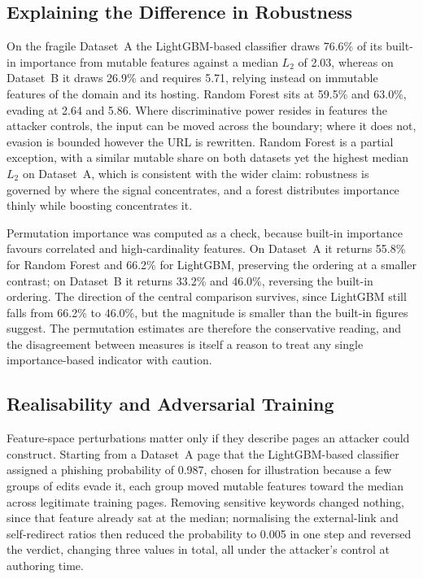 \documentclass[runningheads]{llncs}
\begin{document}
\subsection{Explaining the Difference in Robustness}
\label{sec:res-reliance}

On the fragile Dataset~A the LightGBM-based classifier draws 76.6\% of its built-in importance from mutable features against a median
$L_2$ of 2.03, whereas on Dataset~B it draws 26.9\% and requires 5.71, relying
instead on immutable features of the domain and its hosting. Random Forest sits
at 59.5\% and 63.0\%, evading at 2.64 and 5.86. Where discriminative power resides in features the attacker controls, the input
can be moved across the boundary; where it does not, evasion is bounded however
the URL is rewritten. Random Forest is a partial exception, with
a similar mutable share on both datasets yet the highest median $L_2$ on
Dataset~A, which is consistent with the wider claim: robustness is governed by
where the signal concentrates, and a forest distributes importance thinly while
boosting concentrates it.

Permutation importance was computed as a check, because built-in
importance favours correlated and high-cardinality features. On Dataset~A it
returns 55.8\% for Random Forest and 66.2\% for LightGBM, preserving the
ordering at a smaller contrast; on Dataset~B it returns 33.2\% and 46.0\%,
reversing the built-in ordering. The direction of the central comparison
survives, since LightGBM still falls from 66.2\% to 46.0\%, but the magnitude
is smaller than the built-in figures suggest. The permutation estimates are
therefore the conservative reading, and the disagreement between measures is
itself a reason to treat any single importance-based indicator with caution.


\subsection{Realisability and Adversarial Training}
\label{sec:res-defence}

Feature-space perturbations matter only if they describe pages an attacker could
construct. Starting from a Dataset~A page that the LightGBM-based classifier
assigned a phishing probability of
0.987, chosen for illustration because a few groups of edits evade it, each
group moved mutable features toward the median across legitimate training
pages. Removing sensitive keywords changed nothing, since that feature
already sat at the median; normalising the external-link and self-redirect
ratios then reduced the probability to 0.005 in one step and reversed the
verdict, changing three values in total, all under the attacker's control at
authoring time.
\end{document}
